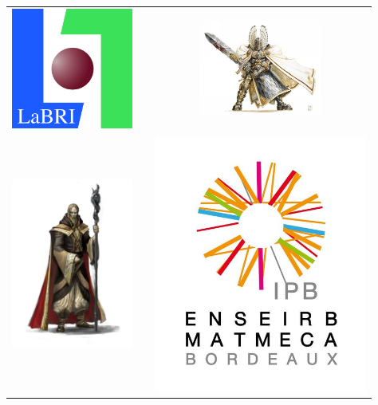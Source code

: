 
\begin{titlepage}
\begin{center}
  
  \begin{center}
    \begin{tabular}{c c c}
      

      \includegraphics [width=40mm]{Images/LABRI.jpg} & & \includegraphics [width=40mm]{Images/Guerrier.jpg}\\
      
      \includegraphics [width=40mm]{Images/Mage.jpg}& & \includegraphics [width=70mm]{Images/ENSEIRB-MATMECA.jpg} \\


\end{tabular}
\end{center}
\end{center}
\end{titlepage}
